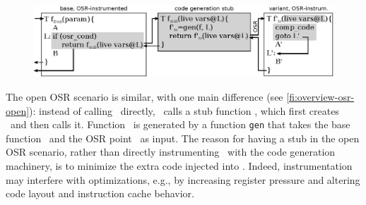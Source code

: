 \ifdefined\noauthorea
\begin{figure}[h!]
\begin{center}
\includegraphics[width=1.0\columnwidth]{figures/overview-osr-open/overview-osr-open.eps}
\caption{\protect}
\end{center}
\end{figure}
\fi

\noindent The open OSR scenario is similar, with one main difference (see \myfigure\ref{fi:overview-osr-open}): instead of calling \fosrto\ directly, \fosrfrom\ calls a stub function \fstub, which first creates \fosrto\ and then calls it. Function \fosrto\ is generated by a function {\tt gen} that takes the base function \fbase\ and the OSR point \osrpoint\ as input. The reason for having a stub in the open OSR scenario, rather than directly instrumenting \fbase\ with the code generation machinery, is to minimize the extra code injected into \fbase. Indeed, instrumentation may interfere with optimizations, e.g., by increasing register pressure and altering code layout and instruction cache behavior.


